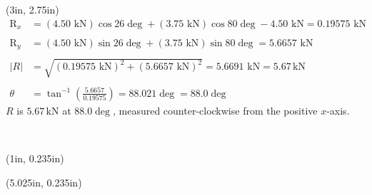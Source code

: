 \documentclass[10pt,oneside]{article}
\def\scale{1}
\begin{document}
\begin{textblock*}{5in}(3in, 2.75in)
	\begin{align*}
		\mathrm{R}_x &= (4.50\text{ kN})\cos 26\deg + (3.75\text{ kN})\cos 80\deg - 4.50\text{ kN} = 0.19575\text{ kN}\\\\
		\mathrm{R}_y &= (4.50\text{ kN})\sin 26\deg + (3.75\text{ kN})\sin 80\deg = 5.6657\text{ kN}\\\\
		\left|R\right| &= \sqrt{(0.19575\text{ kN})^2+(5.6657\text{ kN})^2} = 5.6691\text{ kN} = 5.67\,\text{kN}\\\\
		\theta &= \tan^{-1}\left(\frac{5.6657}{0.19575}\right) = 88.021\deg = 88.0\deg
	\end{align*}
	\centering
	$R$ is $5.67\,\text{kN}$ at $88.0\deg$, measured counter-clockwise from the positive $x$-axis.

\end{textblock*}
~\newpage
\begin{textblock*}{3.45in}(1in, 0.235in)
\end{textblock*}
\begin{textblock*}{2.75in}(5.025in, 0.235in)
	\cbox{
	\def\scale{0.7}
	\centering
	
	}
\end{textblock*}
\end{document}
